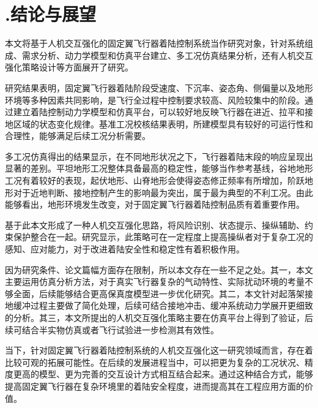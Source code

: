 
\chapter{.结论与展望}

本文将基于人机交互强化的固定翼飞行器着陆控制系统当作研究对象，针对系统组成、需求分析、动力学模型和仿真平台建立、多工况仿真结果分析，还有人机交互强化策略设计等方面展开了研究。

研究结果表明，固定翼飞行器着陆阶段受速度、下沉率、姿态角、侧偏量以及地形环境等多种因素共同影响，是飞行全过程中控制要求较高、风险较集中的阶段。通过建立着陆控制动力学模型和仿真平台，可以较好地反映飞行器在进近、拉平和接地区域的状态变化规律。基准工况校核结果表明，所建模型具有较好的可运行性和合理性，能够满足后续工况分析需要。

多工况仿真得出的结果显示，在不同地形状况之下，飞行器着陆末段的响应呈现出显著的差别。平坦地形工况整体具备最高的稳定性，能够当作参考基线，谷地地形工况有着较好的表现，起伏地形、山脊地形会使得姿态修正频率有所增加，阶跃地形对于近地判断、接地控制产生的影响最为突出，属于最为典型的不利工况。由此能够看出，地形环境发生改变，对于固定翼飞行器着陆控制品质有着重要作用。

基于此本文形成了一种人机交互强化思路，将风险识别、状态提示、操纵辅助、约束保护整合在一起。研究显示，此策略可在一定程度上提高操纵者对于复杂工况的感知、应对能力，对于改进着陆安全性和稳定性有着积极作用。

因为研究条件、论文篇幅方面存在限制，所以本文存在一些不足之处。其一，本文主要运用仿真分析方法，对于真实飞行器复杂的气动特性、实际扰动环境的考量不够全面，后续能够结合更高保真度模型进一步优化研究。其二，本文针对起落架接地缓冲过程主要做了简化处理，后续可结合接地冲击、缓冲系统动力学展开更细致的分析。其三，本文所提出的人机交互强化策略主要在仿真平台上得到了验证，后续可结合半实物仿真或者飞行试验进一步检测其有效性。

当下，针对固定翼飞行器着陆控制系统的人机交互强化这一研究领域而言，存在着比较可观的拓展可能性。在后续的发展进程当中，可以把更为复杂的工况状况、精度更高的模型、更为完善的交互设计方式相互结合起来。通过这种结合方式，能够提高固定翼飞行器在复杂环境里的着陆安全程度，进而提高其在工程应用方面的价值。
